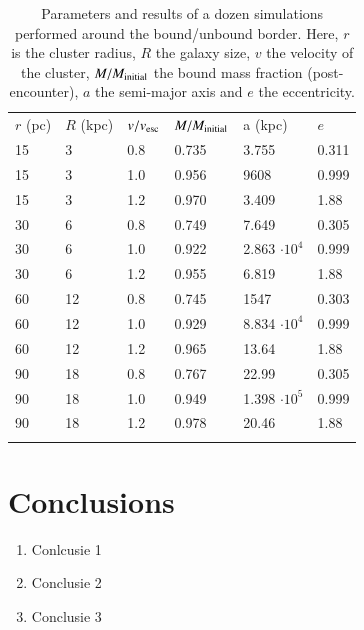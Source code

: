\documentclass{aa}
\begin{document}
   \begin{table}
      \caption[]{Parameters and results of a dozen simulations performed around the bound/unbound border. Here, $r$ is the cluster radius, $R$ the
      		    galaxy size, $v$ the velocity of the cluster, $M/M_{\rm initial}$ the bound mass fraction (post-encounter), $a$ the semi-major axis 
		    and $e$ the eccentricity.}
         \label{tab:parameterspace}
         \begin{tabular}{llllll}
            \hline
            \noalign{\smallskip}
            $r$ (pc) & $R$ (kpc) & $v / v_{\rm esc}$ & $M/M_{\rm initial}$ & a (kpc) & $e$ \\ 
            \noalign{\smallskip}
            \hline
            \noalign{\smallskip}   
            15 & 3 & 0.8 & 0.735 & 3.755 & 0.311 \\                 
            15 & 3 & 1.0 & 0.956 & 9608 & 0.999 \\
            15 & 3 & 1.2 & 0.970 & 3.409 & 1.88 \\                 
            30 & 6 & 0.8 & 0.749 & 7.649 & 0.305 \\
            30 & 6 & 1.0 & 0.922 & 2.863 $\cdot 10^4$ & 0.999 \\                 
            30 & 6 & 1.2 & 0.955 & 6.819& 1.88 \\                 
            60 & 12 & 0.8 & 0.745 & 1547 & 0.303 \\
            60 & 12 & 1.0 & 0.929 & 8.834 $\cdot 10^4$ & 0.999 \\                 
            60 & 12 & 1.2 & 0.965 & 13.64 & 1.88  \\
            90 & 18 & 0.8 & 0.767 & 22.99 & 0.305  \\
            90 & 18 & 1.0 & 0.949 & 1.398 $\cdot 10^5$ & 0.999 \\                 
            90 & 18 & 1.2 & 0.978 & 20.46 & 1.88 \\
            \noalign{\smallskip}
            \hline
         \end{tabular}
   \end{table}
         
         
         
\section{Conclusions}

   \begin{enumerate}
      \item Conlcusie 1
      \item Conclusie 2
      \item Conclusie 3
   \end{enumerate}
\end{document}
